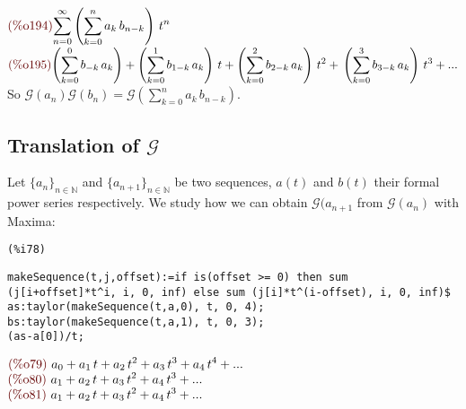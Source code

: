 \begin{math}\displaystyle
\parbox{8ex}{\color{labelcolor}(\%o194) }
\sum_{n=0}^{\infty }\left( \sum_{k=0}^{n}{a}_{k}\,{b}_{n-k}\right) \,{t}^{n}
\end{math}\\
\begin{math}\displaystyle
\parbox{8ex}{\color{labelcolor}(\%o195) }
\left( \sum_{k=0}^{0}{b}_{-k}\,{a}_{k}\right) +\left(
  \sum_{k=0}^{1}{b}_{1-k}\,{a}_{k}\right) \,t+\left(
  \sum_{k=0}^{2}{b}_{2-k}\,{a}_{k}\right) \,{t}^{2}+\\
\left( \sum_{k=0}^{3}{b}_{3-k}\,{a}_{k}\right) \,{t}^{3}+...
\end{math}\\
So $\mathcal{G}(a_n)\mathcal{G}(b_n) =\mathcal{G}\left(
  \sum_{k=0}^{n}{a}_{k}\,{b}_{n-k}\right)$.

\subsection{Translation of $\mathcal{G} $}

Let $\{a_n\}_{n\in\mathbb{N} }$ and $\{a_{n+1}\}_{n\in\mathbb{N} } $
be two sequences, $a(t)$ and $b(t)$ their formal power series
respectively. We study how we can obtain $\mathcal{G}(a_{n+1} $ from
$\mathcal{G} (a_n)$ with Maxima:\\

\noindent
\begin{minipage}[t]{8ex}{\color{red}\bf
\begin{verbatim}
(%i78) 
\end{verbatim}}
\end{minipage}
\begin{minipage}[t]{\textwidth}{\color{blue}
\begin{verbatim}
makeSequence(t,j,offset):=if is(offset >= 0) then sum
(j[i+offset]*t^i, i, 0, inf) else sum (j[i]*t^(i-offset), i, 0, inf)$
as:taylor(makeSequence(t,a,0), t, 0, 4);
bs:taylor(makeSequence(t,a,1), t, 0, 3);
(as-a[0])/t;
\end{verbatim}}
\end{minipage}
\begin{math}\displaystyle
\parbox{8ex}{\color{labelcolor}(\%o79) }
{a}_{0}+{a}_{1}\,t+{a}_{2}\,{t}^{2}+{a}_{3}\,{t}^{3}+{a}_{4}\,{t}^{4}+...
\end{math}\\
\begin{math}\displaystyle
\parbox{8ex}{\color{labelcolor}(\%o80) }
{a}_{1}+{a}_{2}\,t+{a}_{3}\,{t}^{2}+{a}_{4}\,{t}^{3}+...
\end{math}\\
\begin{math}\displaystyle
\parbox{8ex}{\color{labelcolor}(\%o81) }
{a}_{1}+{a}_{2}\,t+{a}_{3}\,{t}^{2}+{a}_{4}\,{t}^{3}+...
\end{math}

